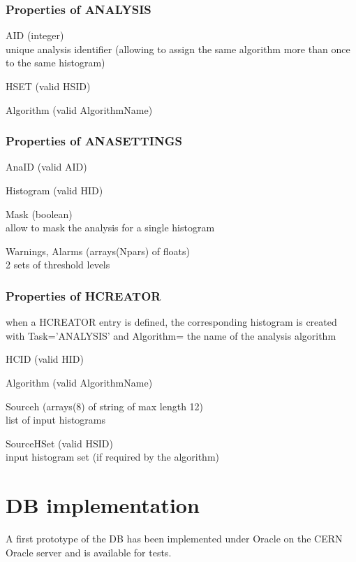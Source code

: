 \documentclass{lhcbnote}
\begin{document}
\subsubsection{Properties of ANALYSIS}
\begin{description}
\item{AID} (integer)\\
unique analysis identifier (allowing to assign the same algorithm more
than once to the same histogram)
\item{HSET}  (valid HSID)
\item{Algorithm}  (valid AlgorithmName)
\end{description}

\subsubsection{Properties of ANASETTINGS}
\begin{description}
\item{AnaID} (valid AID)
\item{Histogram}  (valid HID)
\item{Mask} (boolean)\\
allow to mask the analysis for a single histogram
\item{Warnings, Alarms} (arrays(Npars) of floats)\\
2 sets of threshold levels
\end{description}

\subsubsection{Properties of HCREATOR}
when a HCREATOR entry is defined, the corresponding histogram is
created with Task='ANALYSIS' and Algorithm= the name of the analysis algorithm
\begin{description}
\item{HCID} (valid HID)
\item{Algorithm} (valid AlgorithmName)
\item{Sourceh} (arrays(8) of string of max length 12)\\
list of input histograms
\item{SourceHSet} (valid HSID)\\
input histogram set (if required by the algorithm)
\end{description}

\section{DB implementation}
A first prototype of the DB has been implemented under Oracle on the
CERN Oracle server and is available for tests.
\end{document}
